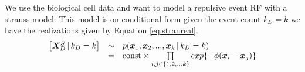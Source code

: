 \section{}
\label{sec:problem4}

We use the biological cell data and want to model a repulsive event RF with a strauss model. This model is on conditional form given the event count $k_D = k$ we have the realizations given by Equation \ref{eq:straureal}. 
\begin{equation}
    \begin{array}{rcl}
        \left[\bm{X}_D^S \, | \, k_D = k\right] & \sim & p(\bm{x}_1,\bm{x}_2,...,\bm{x}_k \, | \, k_D = k) \\
         & = & \mathrm{const} \times \prod\limits_{i,j\in \{1,2,...k\}} exp\{-\phi(\bm{x}_i-\bm{x}_j)\}
    \end{array}
    \label{eq:straureal}
\end{equation}

